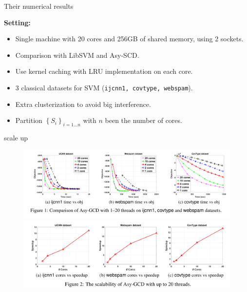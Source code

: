 \documentclass{beamer}
\def\mycite#1{\hfill\textcolor{gray}{\cite{#1}}}
\begin{document}
\begin{frame}{Their numerical results}

	{\bf Setting:}
	\begin{itemize}\itemsep1em
	\item Single machine with 20 cores and 256GB of shared memory, using 2 sockets.
	\item Comparison with LibSVM and Asy-SCD.
	\item Use kernel caching with LRU implementation on each core.
	\item 3 classical datasets for SVM ({\tt ijcnn1, covtype, webspam}).
	\item Extra clusterization to avoid big interference. \mycite{Scherrer2012}
	\item Partition $\left \{ S_i \right \}_{i=1\dots n} $ with $n$ been the number of cores.
\end{itemize}
	
\end{frame}
\begin{frame}{scale up}

\begin{figure}[htp]
\centering
\includegraphics[width=\textwidth]{fig1}\\[-.2em]
\includegraphics[width=\textwidth]{fig2}
\end{figure}

	
\end{frame}
	
\end{document}
